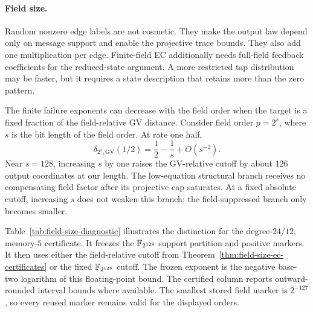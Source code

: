 \paragraph{Field size.}
Random nonzero edge labels are not cosmetic.  They make the output law depend
only on message support and enable the projective trace bounds.  They also add
one multiplication per edge.  Finite-field EC additionally needs full-field
feedback coefficients for the reduced-state argument.  A more restricted tap
distribution may be faster, but it requires a state description that retains
more than the zero pattern.

The finite failure exponents can decrease with the field order when the target
is a fixed fraction of the field-relative GV distance.  Consider field order
$p=2^s$, where $s$ is the bit length of the field order.  At rate one half,
\[
 \delta_{2^s,\mathrm{GV}}(1/2)=\frac12-\frac1s+O(s^{-2}).
\]
Near $s=128$, increasing $s$ by one raises the GV-relative cutoff by about
$126$ output coordinates at our length.  The low-equation
structural branch receives no compensating field factor after its projective
cap saturates.  At a fixed absolute cutoff, increasing $s$ does not weaken
this branch; the field-suppressed branch only becomes smaller.

Table~\ref{tab:field-size-diagnostic} illustrates the distinction for the
degree-$24/12$, memory-$5$ certificate.  It freezes the $\mathbb F_{2^{128}}$ support
partition and positive markers.  It then uses either the field-relative
cutoff from Theorem~\ref{thm:field-size-ec-certificates} or the fixed
$\mathbb F_{2^{128}}$ cutoff.  The frozen exponent is the negative base-two
logarithm of this floating-point bound.  The certified column reports
outward-rounded interval bounds where available.  The smallest stored field
marker is $2^{-127}$, so every reused marker remains valid for the displayed
orders.

